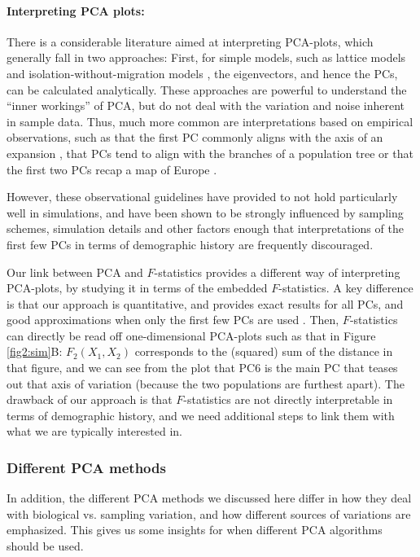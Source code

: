 \documentclass[12pt, letterpaper]{article}
\begin{document}
\paragraph{Interpreting PCA plots:}
There is a considerable literature aimed at interpreting PCA-plots, which generally fall in two approaches: First, for simple models, such as lattice models \cite{novembre_interpreting_2008} and isolation-without-migration models \cite{mcvean_genealogical_2009}, the eigenvectors, and hence the PCs, can be calculated analytically. These approaches are powerful to understand the ``inner workings'' of PCA, but do not deal with the variation and noise inherent in sample data. Thus, much more common are interpretations based on empirical observations, such as that the first PC commonly aligns with the axis of an expansion \cite{l_l_cavalli-sforza_history_1996}, that PCs tend to align with the branches of a population tree or that the first two PCs recap a map of Europe \citep{novembre_genes_2008, cavalli-sforza_analysis_1975}.

However, these observational guidelines have provided to not hold particularly well in simulations, and have been shown to be strongly influenced by sampling schemes, simulation details and other factors \citep{novembre_interpreting_2008, degiorgio_geographic_2013, elhaik_principal_2022, jay_anisotropic_2013} enough that interpretations of the first few PCs in terms of demographic history are frequently discouraged.

Our link between PCA and $F$-statistics provides a different way of interpreting PCA-plots, by studying it in terms of the embedded $F$-statistics. A key difference is that our approach is quantitative, and provides exact results for all PCs, and good approximations when only the first few PCs are used \cite{peter_geometric_2022}. Then, $F$-statistics can directly be read off one-dimensional PCA-plots such as that in Figure \ref{fig2:sim}B: $F_2(X_1, X_2)$ corresponds to the (squared) sum of the distance in that figure, and we can see from the plot that PC6 is the main PC that teases out that axis of variation (because the two populations are furthest apart).  
The drawback of our approach is that $F$-statistics are not directly interpretable in terms of demographic history, and we need additional steps to link them with what we are typically interested in. 

\subsubsection{Different PCA methods}
In addition, the different PCA methods we discussed here differ in how they deal with biological vs. sampling variation, and how different sources of variations are emphasized. This gives us some insights for when different PCA algorithms should be used. 
\end{document}
